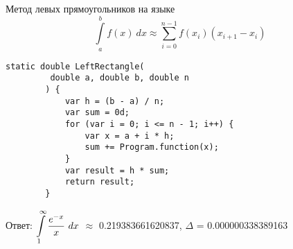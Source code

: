 \def \itemtitle {Метод левых прямоугольников на языке \textit \Csh}

\item 
	\itemtitle
	\[ \int \limits_{a}^{b} {f(x) ~ dx} 
	\approx \sum \limits_{i=0}^{n-1} f({x}_{i})({x}_{i+1} - {x}_{i}) \]
	\begin{lstlisting}[caption=\itemtitle]
		static double LeftRectangle(
		 double a, double b, double n
		) {
			var h = (b - a) / n;
			var sum = 0d;
			for (var i = 0; i <= n - 1; i++) {
				var x = a + i * h;
				sum += Program.function(x);
			}
			var result = h * sum;
			return result;
		}
	\end{lstlisting}
	Ответ: $\displaystyle \int\limits_1^{\infty} {\frac{ e^{-x} }{ x } ~ dx}$ $\approx$ 0.219383661620837, $\Delta$ = 0.000000338389163
